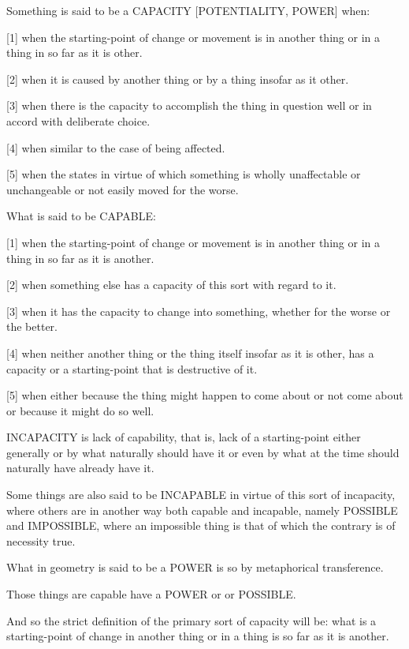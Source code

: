 
Something is said to be a CAPACITY [POTENTIALITY, POWER] when:

[1]     when the starting-point of change or movement is in another thing or
        in a thing in so far as it is other.

[2]     when it is caused by another thing or
        by a thing insofar as it other.

[3]     when there is the capacity to accomplish the thing in question well
        or in accord with deliberate choice.

[4]     when similar to the case of being affected.

[5]     when the states in virtue of which something is wholly
        unaffectable or unchangeable or not easily moved for the worse.

What is said to be CAPABLE:

[1]     when the starting-point of change or movement is in another thing or
        in a thing in so far as it is another.

[2]     when something else has a capacity of this sort with regard to it. 

[3]     when it has the capacity to change into something,
        whether for the worse or the better.

[4]     when neither another thing or the thing itself insofar as it is other,
        has a capacity or a starting-point that is destructive of it.

[5]     when either because the thing might happen to come about or
        not come about or because it might do so well.

INCAPACITY is lack of capability, that is, lack of a starting-point
either generally or by what naturally should have it or even by
what at the time should naturally have already have it.

Some things are also said to be INCAPABLE in virtue of this sort of
incapacity, where others are in another way both capable and incapable, namely
POSSIBLE and IMPOSSIBLE, where an impossible thing is that of which
the contrary is of necessity true.

What in geometry is said to be a POWER is so by metaphorical transference.

Those things are capable have a POWER or or POSSIBLE.

And so the strict definition of the primary sort of capacity will be:
what is a starting-point of change in another thing or
in a thing is so far as it is another.
